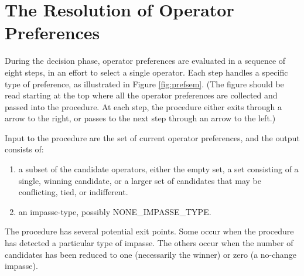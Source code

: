 \chapter{The Resolution of Operator Preferences}
\label{PREFERENCES}


During the decision phase, operator preferences are evaluated in a sequence 
of eight steps, in an effort to select a single operator. 
Each step handles a specific type of preference, as illustrated in Figure 
\ref{fig:prefsem}. (The figure should be read starting at the top
where all the operator preferences are collected and passed into the procedure. At
each step, the procedure either exits through a arrow to the right, or passes to 
the next step through an arrow to the left.)

Input to the procedure are the set of current operator preferences, and the output
consists of:
\begin{enumerate}
\item a subset of the candidate operators, either the empty set, a set consisting of a single, 
winning candidate, or a larger set of candidates that may be conflicting,
tied, or indifferent.
\item an impasse-type, possibly NONE\_IMPASSE\_TYPE.
\end{enumerate}
The procedure has several potential exit points. Some occur when the procedure
has detected a particular type of impasse. The others occur when the number of
candidates has been reduced to 
one (necessarily the winner) or zero (a no-change impasse).

